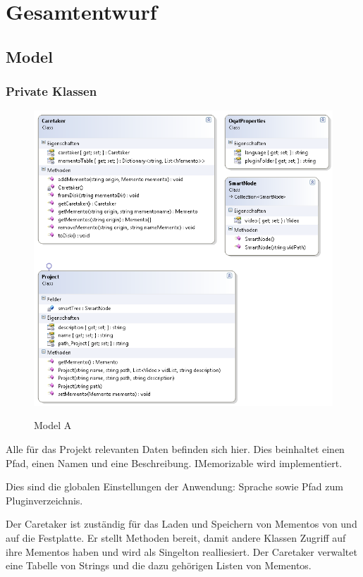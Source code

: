 \chapter{Gesamtentwurf}

\section{Model}

\subsection{Private Klassen}
\begin{figure}[H]
\noindent\includegraphics[scale=1]{bilder/Klassendiagramm/Model.png}
\label{Private Model A}
\caption{Model A}
\end{figure}

Alle für das Projekt relevanten Daten befinden sich hier. Dies beinhaltet einen Pfad, einen Namen und eine Beschreibung. IMemorizable wird implementiert.


Dies sind die globalen Einstellungen der Anwendung: Sprache sowie Pfad zum Pluginverzeichnis.


Der Caretaker ist zuständig für das Laden und Speichern von Mementos von und auf die Festplatte.
Er stellt Methoden bereit, damit andere Klassen Zugriff auf ihre Mementos haben und wird als Singelton realliesiert. Der Caretaker verwaltet eine Tabelle von Strings und die dazu gehörigen Listen von Mementos. 



